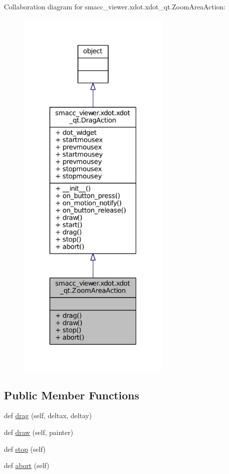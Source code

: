 Collaboration diagram for smacc\+\_\+viewer.\+xdot.\+xdot\+\_\+qt.\+Zoom\+Area\+Action\+:
\nopagebreak
\begin{figure}[H]
\begin{center}
\leavevmode
\includegraphics[width=211pt]{classsmacc__viewer_1_1xdot_1_1xdot__qt_1_1ZoomAreaAction__coll__graph}
\end{center}
\end{figure}
\subsection*{Public Member Functions}
\begin{DoxyCompactItemize}
\item 
def \hyperlink{classsmacc__viewer_1_1xdot_1_1xdot__qt_1_1ZoomAreaAction_a4d6c803f3871e5a33ebc86ac8e932a08}{drag} (self, deltax, deltay)
\item 
def \hyperlink{classsmacc__viewer_1_1xdot_1_1xdot__qt_1_1ZoomAreaAction_aebb14cd4264834ee7c939623c06f604e}{draw} (self, painter)
\item 
def \hyperlink{classsmacc__viewer_1_1xdot_1_1xdot__qt_1_1ZoomAreaAction_a500e6bdcf8ae635a318f7fb80059ac1c}{stop} (self)
\item 
def \hyperlink{classsmacc__viewer_1_1xdot_1_1xdot__qt_1_1ZoomAreaAction_aaed47ad001046482e45c611c4a61b490}{abort} (self)
\end{DoxyCompactItemize}
